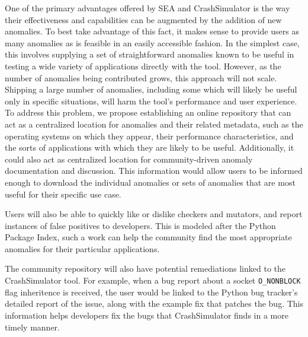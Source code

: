 One of the primary advantages offered by SEA and CrashSimulator is the way
their effectiveness and capabilities can be augmented by the addition of
new anomalies.  To best take advantage of this fact, it makes sense to
provide users as many anomalies as is feasible in an easily accessible
fashion.  In the simplest case, this involves supplying a set of
straightforward anomalies known to be useful in testing a wide
variety of applications directly with the tool.
However, as the number of anomalies being contributed grows, this approach
will not scale.  Shipping a large number of anomalies, including some
which will likely be useful only in specific situations, will harm the
tool's performance and user experience.  To address this problem, we
propose establishing an online repository
that can act as a centralized location for anomalies
and their related metadata,
such as the operating systems on which they appear,
their performance characteristics, and the sorts of applications
with which they are likely to be useful.  Additionally, it could also
act as centralized location for community-driven anomaly documentation
and discussion.  This information would allow users to be informed enough
to download the individual anomalies or sets of anomalies that are most
useful for their specific use case.

Users will also be able to quickly like or dislike checkers and mutators,
and report instances of false positives to developers.
This is modeled after the Python Package Index,
such a work can help the community find the most appropriate
anomalies for their particular applications.

The community repository will also have potential remediations linked to
the CrashSimulator tool.  For example, when a bug report about a
socket {\tt O\_NONBLOCK} flag inheritence is received, the user would be linked
to the Python
bug tracker's detailed report of the issue, along with the example fix that
patches the bug.  This information helps developers fix the
bugs that CrashSimulator finds in a more timely manner.


%


%


